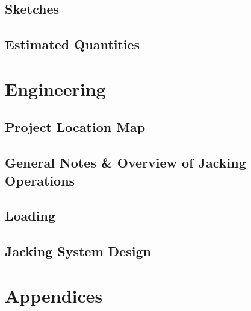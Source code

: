 \documentclass[11pt,letterpaper]{report}
\begin{document}
\section{Sketches}

\section{Estimated Quantities}


\setcounter{page}{1}
\renewcommand{\thepage}{}
\chapter{Engineering}
\renewcommand{\thepage}{\arabic{chapter}-\arabic{page}}
\section{Project Location Map}

\renewcommand{\thepage}{\arabic{chapter}-\arabic{page}}
\section{General Notes \& Overview of Jacking Operations}
 
 
\renewcommand{\thepage}{\arabic{chapter}-\arabic{page}}
\section{Loading}
 

\renewcommand{\thepage}{\arabic{chapter}-\arabic{page}}
\section{Jacking System Design}



\setcounter{chapter}{0}
\setcounter{page}{-1}
\setcounter{secnumdepth}{2}
\setcounter{section}{0}
\renewcommand{\thepage}{ }
\renewcommand{\thesection}{}


\renewcommand{\thepage}{}
\chapter*{Appendices}
\end{document}
